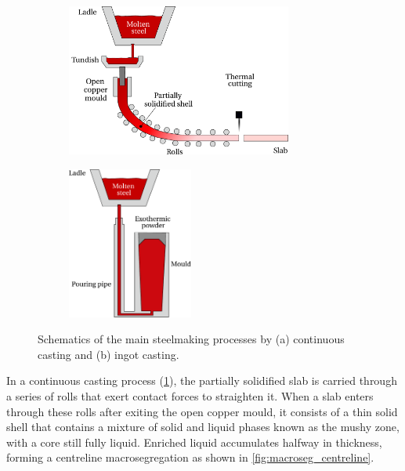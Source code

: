 \begin{figure}[htbp]
\centering
  \begin{subfigure}[t]{0.6\textwidth}
    \centering
	\includegraphics[height=5cm]{Chapter1/Graphics/fig_continuous_casting.pdf}
	\caption{}
    \label{fig:continuous_casting}
  \end{subfigure}
   \begin{subfigure}[t]{0.3\textwidth}
    \centering
	\includegraphics[height=5cm]{Chapter1/Graphics/fig_ingot_casting.pdf}
	\caption{}
    \label{fig:ingot_casting}
  \end{subfigure}
\caption{Schematics of the main steelmaking processes by (a) continuous casting and (b) ingot casting.} 
\label{fig:casting}
\end{figure}
%
%

In a continuous casting process (\cref{fig:continuous_casting}), the partially solidified slab is carried through a series of rolls that exert contact forces to straighten it.
When a slab enters through these rolls after exiting the open copper mould, it consists of a thin solid shell that contains a mixture of solid and liquid phases known as the mushy zone, 
with a core still fully liquid.
Enriched liquid accumulates halfway in thickness, forming a centreline macrosegregation
as shown in \cref{fig:macroseg_centreline}.  

